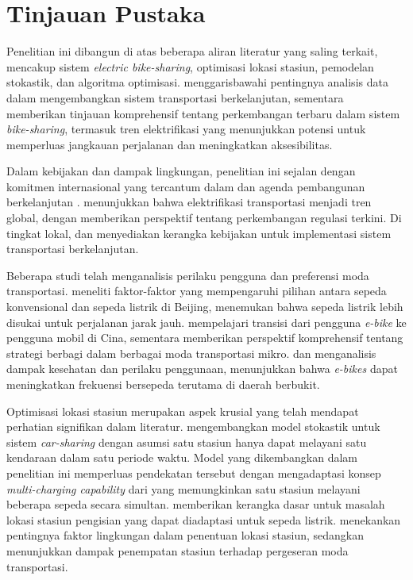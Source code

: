\section{Tinjauan Pustaka}

Penelitian ini dibangun di atas beberapa aliran literatur yang saling terkait, mencakup sistem \textit{electric bike-sharing}, optimisasi lokasi stasiun, pemodelan stokastik, dan algoritma optimisasi.  menggarisbawahi pentingnya analisis data dalam mengembangkan sistem transportasi berkelanjutan, sementara  memberikan tinjauan komprehensif tentang perkembangan terbaru dalam sistem \textit{bike-sharing}, termasuk tren elektrifikasi yang menunjukkan potensi untuk memperluas jangkauan perjalanan dan meningkatkan aksesibilitas.

Dalam kebijakan dan dampak lingkungan, penelitian ini sejalan dengan komitmen internasional yang tercantum dalam  dan agenda pembangunan berkelanjutan .  menunjukkan bahwa elektrifikasi transportasi menjadi tren global, dengan  memberikan perspektif tentang perkembangan regulasi terkini. Di tingkat lokal,  dan  menyediakan kerangka kebijakan untuk implementasi sistem transportasi berkelanjutan.

Beberapa studi telah menganalisis perilaku pengguna dan preferensi moda transportasi.  meneliti faktor-faktor yang mempengaruhi pilihan antara sepeda konvensional dan sepeda listrik di Beijing, menemukan bahwa sepeda listrik lebih disukai untuk perjalanan jarak jauh.  mempelajari transisi dari pengguna \textit{e-bike} ke pengguna mobil di Cina, sementara  memberikan perspektif komprehensif tentang strategi berbagi dalam berbagai moda transportasi mikro.  dan  menganalisis dampak kesehatan dan perilaku penggunaan, menunjukkan bahwa \textit{e-bikes} dapat meningkatkan frekuensi bersepeda terutama di daerah berbukit.

Optimisasi lokasi stasiun merupakan aspek krusial yang telah mendapat perhatian signifikan dalam literatur.  mengembangkan model stokastik untuk sistem \textit{car-sharing} dengan asumsi satu stasiun hanya dapat melayani satu kendaraan dalam satu periode waktu. Model yang dikembangkan dalam penelitian ini memperluas pendekatan tersebut dengan mengadaptasi konsep \textit{multi-charging capability} dari  yang memungkinkan satu stasiun melayani beberapa sepeda secara simultan.  memberikan kerangka dasar untuk masalah lokasi stasiun pengisian yang dapat diadaptasi untuk sepeda listrik.  menekankan pentingnya faktor lingkungan dalam penentuan lokasi stasiun, sedangkan  menunjukkan dampak penempatan stasiun terhadap pergeseran moda transportasi.

